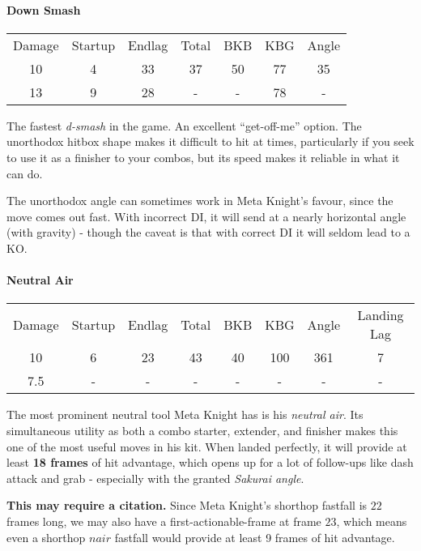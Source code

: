\paragraph{Down Smash}
\begin{center}
	\begin{tabular}{| c | c  c  c | c  c  c |}
		\hline
		Damage 	&	Startup	& Endlag & Total & BKB 	& 	KBG & Angle		\\
		10		&	4		&	33	 &	37	&	50	&	77 & 	35\deg 	\\
		13		&	9		&	28	 &	-	&	- 	& 	78 	&	-		\\
		\hline
	\end{tabular}
\end{center}
The fastest \textit{d-smash} in the game. An excellent ``get-off-me'' option. The unorthodox hitbox shape makes it difficult to hit at times, particularly if you seek to use it as a finisher to your combos, but its speed makes it reliable in what it can do.

The unorthodox angle can sometimes work in Meta Knight's favour, since the move comes out fast. With incorrect DI, it will send at a nearly horizontal angle (with gravity) - though the caveat is that with correct DI it will seldom lead to a KO.

\paragraph{Neutral Air}
\begin{center}
	\begin{tabular}{| c | c  c  c | c  c  c | c |}
		\hline
		Damage &	Startup	& Endlag & Total & BKB & KBG & Angle &	Landing Lag	\\
		10	&	6	&	23	&	43	&	40	&	100 & 	361\deg	&	7 		\\
		7.5	&	-	&	-	&	-	&	- 	& 	- 	&	-		&	-		\\
		\hline
	\end{tabular}
\end{center}
The most prominent neutral tool Meta Knight has is his \textit{neutral air}. Its simultaneous utility as both a combo starter, extender, and finisher makes this one of the most useful moves in his kit. When landed perfectly, it will provide at least \textbf{18 frames} of hit advantage, which opens up for a lot of follow-ups like dash attack and grab - especially with the granted \textit{Sakurai angle}. 

\textbf{This may require a citation.} Since Meta Knight's shorthop fastfall is $22$ frames long, we may also have a first-actionable-frame at frame $23$, which means even a shorthop $nair$ fastfall would provide at least 9 frames of hit advantage.
